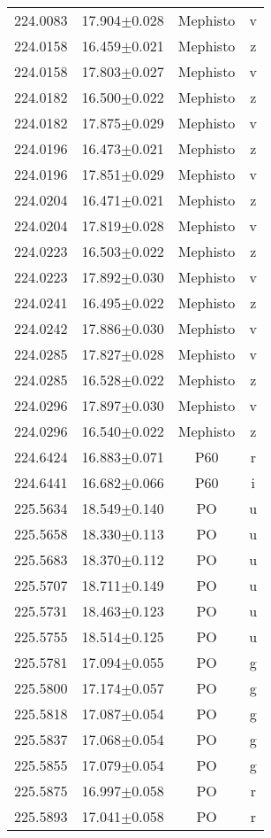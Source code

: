 \begin{table}
\begin{tabular}{cccc}
224.0083 & 17.904$\pm$0.028 & Mephisto & v \\
224.0158 & 16.459$\pm$0.021 & Mephisto & z \\
224.0158 & 17.803$\pm$0.027 & Mephisto & v \\
224.0182 & 16.500$\pm$0.022 & Mephisto & z \\
224.0182 & 17.875$\pm$0.029 & Mephisto & v \\
224.0196 & 16.473$\pm$0.021 & Mephisto & z \\
224.0196 & 17.851$\pm$0.029 & Mephisto & v \\
224.0204 & 16.471$\pm$0.021 & Mephisto & z \\
224.0204 & 17.819$\pm$0.028 & Mephisto & v \\
224.0223 & 16.503$\pm$0.022 & Mephisto & z \\
224.0223 & 17.892$\pm$0.030 & Mephisto & v \\
224.0241 & 16.495$\pm$0.022 & Mephisto & z \\
224.0242 & 17.886$\pm$0.030 & Mephisto & v \\
224.0285 & 17.827$\pm$0.028 & Mephisto & v \\
224.0285 & 16.528$\pm$0.022 & Mephisto & z \\
224.0296 & 17.897$\pm$0.030 & Mephisto & v \\
224.0296 & 16.540$\pm$0.022 & Mephisto & z \\
224.6424 & 16.883$\pm$0.071 & P60 & r \\
224.6441 & 16.682$\pm$0.066 & P60 & i \\
225.5634 & 18.549$\pm$0.140 & PO & u \\
225.5658 & 18.330$\pm$0.113 & PO & u \\
225.5683 & 18.370$\pm$0.112 & PO & u \\
225.5707 & 18.711$\pm$0.149 & PO & u \\
225.5731 & 18.463$\pm$0.123 & PO & u \\
225.5755 & 18.514$\pm$0.125 & PO & u \\
225.5781 & 17.094$\pm$0.055 & PO & g \\
225.5800 & 17.174$\pm$0.057 & PO & g \\
225.5818 & 17.087$\pm$0.054 & PO & g \\
225.5837 & 17.068$\pm$0.054 & PO & g \\
225.5855 & 17.079$\pm$0.054 & PO & g \\
225.5875 & 16.997$\pm$0.058 & PO & r \\
225.5893 & 17.041$\pm$0.058 & PO & r \\

\end{tabular}
\end{table}
